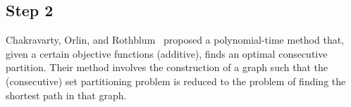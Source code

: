 \documentclass{article}
\newtheorem{lemma}[thm]{Lemma}
\newtheorem{proposition}[thm]{Proposition}
\DeclareMathOperator{\support}{support}
\begin{document}
%
%
%
%
%
%

\subsection{Step 2}
Chakravarty, Orlin, and Rothblum~\cite{chakravarty1982partitioning} proposed a polynomial-time method that, given a certain objective functions (additive), finds an optimal consecutive partition. Their method involves the construction of a graph such that the (consecutive) set partitioning problem is reduced to the problem of finding the shortest path in that graph.
\end{document}
